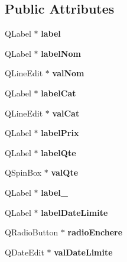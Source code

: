 \subsection*{Public Attributes}
\begin{DoxyCompactItemize}
\item 
Q\-Label $\ast$ {\bfseries label}\label{class_ui___dialog_ajouter_vente_a0148c009801a386f05f72bb1eb85138a}

\item 
Q\-Label $\ast$ {\bfseries label\-Nom}\label{class_ui___dialog_ajouter_vente_a124aae2b361f68cd4e4999a4d5c81c36}

\item 
Q\-Line\-Edit $\ast$ {\bfseries val\-Nom}\label{class_ui___dialog_ajouter_vente_a7f6dc97a576b62dc8412a347ec2acb25}

\item 
Q\-Label $\ast$ {\bfseries label\-Cat}\label{class_ui___dialog_ajouter_vente_a1ad88f317080e18e9b9855589dc73ac1}

\item 
Q\-Line\-Edit $\ast$ {\bfseries val\-Cat}\label{class_ui___dialog_ajouter_vente_a8fd18dbf5b8788ff61cad46e2bbf9cc0}

\item 
Q\-Label $\ast$ {\bfseries label\-Prix}\label{class_ui___dialog_ajouter_vente_a2bc88408689024a4377bc0e2171c19d9}

\item 
Q\-Label $\ast$ {\bfseries label\-Qte}\label{class_ui___dialog_ajouter_vente_a6c8d4acb3eea5f28abe8cee46319ff40}

\item 
Q\-Spin\-Box $\ast$ {\bfseries val\-Qte}\label{class_ui___dialog_ajouter_vente_a763e8a0d9e253d6da640fbac8b02459c}

\item 
Q\-Label $\ast$ {\bfseries label\-\_}\label{class_ui___dialog_ajouter_vente_a3288030f764fff68a7e443c490fe969d}

\item 
Q\-Label $\ast$ {\bfseries label\-Date\-Limite}\label{class_ui___dialog_ajouter_vente_adee51e354846fc85ed2a55004106373f}

\item 
Q\-Radio\-Button $\ast$ {\bfseries radio\-Enchere}\label{class_ui___dialog_ajouter_vente_a6df6af19da8182b012f9ef7494eb8deb}

\item 
Q\-Date\-Edit $\ast$ {\bfseries val\-Date\-Limite}\label{class_ui___dialog_ajouter_vente_a065ebc28106416bec403cecd4783c5c4}


\end{DoxyCompactItemize}
